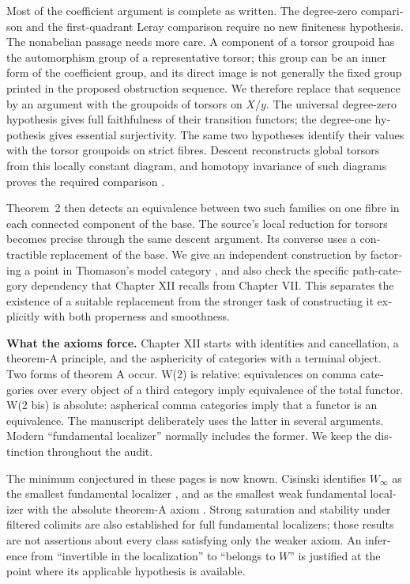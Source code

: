 \begin{otherlanguage}{english}
\begin{otherlanguage}{english}
Most of the coefficient argument is complete as written. The degree-zero comparison and the first-quadrant Leray comparison require no new finiteness hypothesis. The nonabelian passage needs more care. A component of a torsor groupoid has the automorphism group of a representative torsor; this group can be an inner form of the coefficient group, and its direct image is not generally the fixed group printed in the proposed obstruction sequence. We therefore replace that sequence by an argument with the groupoids of torsors on \(X/y\). The universal degree-zero hypothesis gives full faithfulness of their transition functors; the degree-one hypothesis gives essential surjectivity. The same two hypotheses identify their values with the torsor groupoids on strict fibres. Descent reconstructs global torsors from this locally constant diagram, and homotopy invariance of such diagrams proves the required comparison \citep[Theorem~1.3]{Cisinski2009LocallyConstant}.

Theorem~2 then detects an equivalence between two such families on one fibre in each connected component of the base. The source's local reduction for torsors becomes precise through the same descent argument. Its converse uses a contractible replacement of the base. We give an independent construction by factoring a point in Thomason's model category \citep[Theorem~4.9]{Thomason1980}, and also check the specific path-category dependency that Chapter XII recalls from Chapter VII. This separates the existence of a suitable replacement from the stronger task of constructing it explicitly with both properness and smoothness.

\medskip
\noindent\textbf{What the axioms force.}
Chapter XII starts with identities and cancellation, a theorem-A principle, and the asphericity of categories with a terminal object. Two forms of theorem A occur. W(2) is relative: equivalences on comma categories over every object of a third category imply equivalence of the total functor. W(2 bis) is absolute: aspherical comma categories imply that a functor is an equivalence. The manuscript deliberately uses the latter in several arguments. Modern “fundamental localizer” normally includes the former. We keep the distinction throughout the audit.

The minimum conjectured in these pages is now known. Cisinski identifies \(W_\infty\) as the smallest fundamental localizer \citep[Theorem~2.2.11]{Cisinski2004Minimal}, and as the smallest weak fundamental localizer with the absolute theorem-A axiom \citep[Theorem~6.1.18]{Cisinski2006}. Strong saturation and stability under filtered colimits are also established for full fundamental localizers; those results are not assertions about every class satisfying only the weaker axiom. An inference from “invertible in the localization” to “belongs to \(W\)” is justified at the point where its applicable hypothesis is available.


\end{otherlanguage}
\end{otherlanguage}
